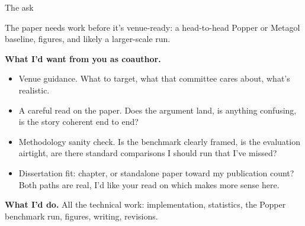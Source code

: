 \documentclass[10pt,aspectratio=169]{beamer}
\begin{document}
\begin{frame}{The ask}

  The paper needs work before it's venue-ready: a head-to-head Popper
  or Metagol baseline, figures, and likely a larger-scale run.

  \vspace{1em}

  \textbf{What I'd want from you as coauthor.}

  \begin{itemize}
    \item Venue guidance. What to target, what that committee cares
          about, what's realistic.
    \item A careful read on the paper. Does the argument land, is
          anything confusing, is the story coherent end to end?
    \item Methodology sanity check. Is the benchmark clearly framed,
          is the evaluation airtight, are there standard comparisons
          I should run that I've missed?
    \item Dissertation fit: chapter, or standalone paper toward
          my publication count? Both paths are real, I'd like
          your read on which makes more sense here.
  \end{itemize}

  \vspace{0.8em}

  \textbf{What I'd do.} All the technical work: implementation,
  statistics, the Popper benchmark run, figures, writing, revisions.

\end{frame}
\end{document}
